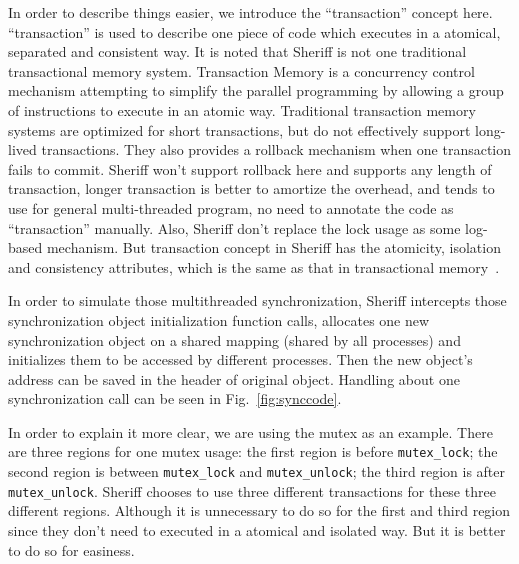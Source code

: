 In order to describe things easier, we introduce the ``transaction'' concept here. 
``transaction'' is used to describe one piece of code which executes in a atomical,  
separated and consistent way. 
It is noted that Sheriff is not one traditional transactional memory system.
Transaction Memory is a concurrency control mechanism 
attempting to simplify the parallel programming by allowing a group of instructions 
to execute in an atomic way.
Traditional transaction memory systems are optimized for short transactions,
but do not effectively support long-lived transactions. They also provides a rollback mechanism
when one transaction fails to commit. 
Sheriff won't support rollback here and supports any length of transaction, 
longer transaction is better to amortize the overhead,
and tends to use for general multi-threaded program, 
no need to annotate the code as ``transaction'' manually.
Also, Sheriff don't replace the lock usage as some log-based mechanism.
But transaction concept in Sheriff has the atomicity, isolation and consistency attributes, which is 
the same as that in transactional memory~\cite{transaction}. 

\begin{comment}
Sheriff read-protects all pages of memory in the beginning of memory so that any intends to write on one 
page can be captured by Sheriff by handling the page fault. 
In the end of transaction, Sheriff tries to publish the modifications
made by current transaction so that other threads in the same application can see the modifications by one thread.
\end{comment}

In order to simulate those multithreaded synchronization, Sheriff intercepts those synchronization object 
initialization function calls, allocates one new synchronization object on a shared mapping (shared by all processes)
and initializes them to be accessed by different processes. Then the new object's address can be saved 
in the header of original object. 
Handling about one synchronization call can be seen in Fig.~\ref{fig:synccode}. 

In order to explain it more clear, we are using the mutex as an example. There are three regions for one mutex usage: 
the first region is before \texttt{mutex\_lock}; the second region is between \texttt{mutex\_lock} and \texttt{mutex\_unlock}; 
 the third region is after \texttt{mutex\_unlock}. Sheriff chooses to use three different transactions for these three different regions.
Although it is unnecessary to do so for the first and third region since they don't need 
to executed in a atomical and isolated way. But it is better to do so for easiness.

